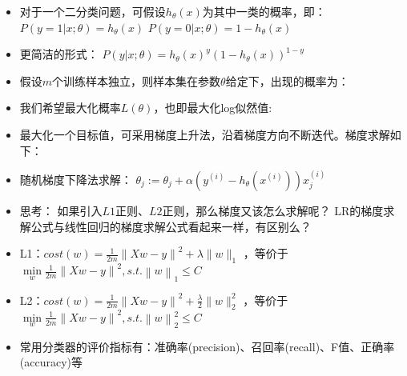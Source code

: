 \documentclass[10pt,a4paper]{ctexbook}
\begin{document}
\begin{itemize}
\item 对于一个二分类问题，可假设$h_{\theta}(x)$为其中一类的概率，即：
\subitem $P(y=1|x;\theta)=h_{\theta}(x)$
\subitem $P(y=0|x;\theta)=1-h_{\theta}(x)$
\item 更简洁的形式： $P(y|x;\theta)={h_{\theta}(x)}^y(1-h_{\theta}(x))^{1-y}$
\item 假设$m$个训练样本独立，则样本集在参数${\theta}$给定下，出现的概率为：

\item 我们希望最大化概率$L({\theta})$，也即最大化log似然值:

\item 最大化一个目标值，可采用梯度上升法，沿着梯度方向不断迭代。梯度求解如下：

\item 随机梯度下降法求解：
\subitem ${\theta}_{j}:={\theta}_{j}+{\alpha}(y^{(i)}-h_{\theta}(x^{(i)}))x_{j}^{(i)}$

\item 思考：
\subitem 如果引入$L1$正则、$L2$正则，那么梯度又该怎么求解呢？
\subitem LR的梯度求解公式与线性回归的梯度求解公式看起来一样，有区别么？

\item L1：$cost(w)={\frac {1}{2m}}\left\|{Xw-y}\right\|^{2}+\lambda\|w\|_{1}$
，等价于
    $\min\limits_{w}{\frac {1}{2m}}\left\|{Xw-y}\right\|^{2}, s.t. \left\|w\right\|_{1}\le{C}$

\item L2：$cost(w)={\frac {1}{2m}}\left\|{Xw-y}\right\|^{2}+{\frac {\lambda}{2}}\|w\|_{2}^{2}$
，等价于
    $\min\limits_{w}{\frac {1}{2m}}\left\|{Xw-y}\right\|^{2}, s.t. \left\|w\right\|_{2}^{2}\le{C}$

\item 常用分类器的评价指标有：准确率(precision)、召回率(recall)、F值、正确率(accuracy)等
\end{itemize}
\end{document}

